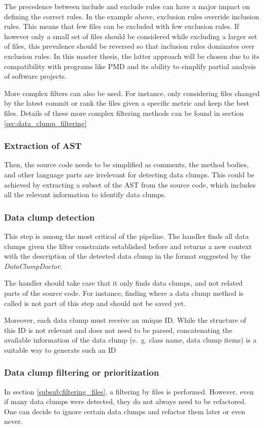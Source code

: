 The precedence between include and exclude rules can have a major impact on defining the correct rules. In the example above, exclusion rules override inclusion rules.  This means that few files can be excluded with few exclusion rules. If however only a small set of files should be considered while excluding a larger set of files, this prevalence should be reversed so that inclusion rules dominates over exclusion rules. In this master thesis, the latter approach will be chosen due to its  compatibility with programs like PMD and its ability to simplify partial analysis of software projects. 

More complex filters can also be used. For instance, only considering files changed by the latest commit or rank the files given a specific metric and keep the best files. Details of these more complex filtering methods can be found in section \ref{sec:data_clump_filtering}
\subsubsection{Extraction of AST}
Then,  the source code needs to be simplified as comments, the method bodies, and other language parts are irrelevant for detecting data clumps. This could be achieved by extracting a subset of the \ac{AST} from the source code, which includes all the relevant information to identify data clumps.


\subsubsection{Data clump detection}
This step is among the most critical of the pipeline. 
The handler finds all data clumps given the filter constraints established before and returns a new context with the description of the detected data clump in the format suggested by the \textit{DataClumpDoctor}. 

The handler should take care that it only finds data clumps, and not related parts of the source code. For instance, finding where a data clump method is called is not part of this step and should not be saved yet. 

Moreover, each data clump must receive an unique ID. While the structure of this ID is not relevant and does not need to be parsed, concatenating the available information of the data clump (e.~g. class name, data clump items) is a suitable way to generate such an ID

\subsubsection{Data clump filtering or prioritization} \label{subsub:filtering_data_clumps}
In section \ref{subsub:filtering_files}, a filtering by files is performed. However, even if many data clumps were detected, they do not always need to be refactored. One can decide to ignore certain data clumps and refactor them later or even never. 


